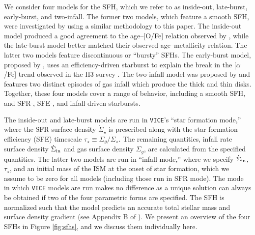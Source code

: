 \documentclass[twocolumn,twocolappendix,linenumbers]{aastex631}
\newcommand{\aFe}{[$\alpha$/Fe]\xspace}
\newcommand{\vice}{{\tt VICE}\xspace}
\begin{document}
We consider four models for the SFH, which we refer to as inside-out, late-burst, early-burst, and two-infall. 
The former two models, which feature a smooth SFH, were investigated by  using a similar methodology to this paper. The inside-out model produced a good agreement to the age--[O/Fe] relation observed by \citet{Feuillet2019-MilkyWayAges}, while the late-burst model better matched their observed age--metallicity relation. 
The latter two models feature discontinuous or ``bursty'' SFHs. The early-burst model, proposed by \citet{Conroy2022-ThickDisk}, uses an efficiency-driven starburst to explain the break in the \aFe trend observed in the H3 survey \citep{Conroy2019-H3Survey}.
The two-infall model was proposed by \citet{Chiappini1997-TwoInfall} and features two distinct episodes of gas infall which produce the thick and thin disks.
Together, these four models cover a range of behavior, including a smooth SFH, and SFR-, SFE-, and infall-driven starbursts.

The inside-out and late-burst models
are run in \vice's ``star formation mode,'' where the SFR surface density $\dot\Sigma_\star$ is prescribed along with the star formation efficiency (SFE) timescale $\tau_\star\equiv \Sigma_g/\dot\Sigma_\star$. The remaining quantities, infall rate surface density $\dot\Sigma_{\rm in}$ and gas surface density $\Sigma_g$, are calculated from the specified quantities. The latter two models are run in ``infall mode,'' where we specify $\dot\Sigma_{\rm in}$, $\tau_\star$, and an initial mass of the ISM at the onset of star formation, which we assume to be zero for all models (including those run in SFR mode). The mode in which \vice models are run makes no difference as a unique solution can always be obtained if two of the four parametric forms are specified. 
The SFH is normalized such that the model predicts an accurate total stellar mass and surface density gradient (see Appendix B of ).
We present an overview of the four SFHs in Figure \ref{fig:sfhs}, and we discuss them individually here.
\end{document}
